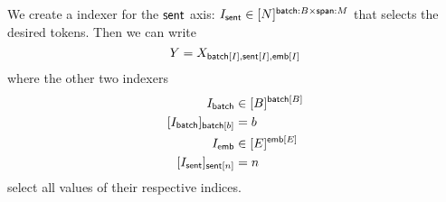 We create a indexer for the $\mathsf{sent}$ axis: $I_{\mathsf{sent}} \in [N]^{\mathsf{batch}:B \times \mathsf{span}: M}$ that selects the desired tokens. Then we can write
\begin{equation*}
  Y = X_{\mathsf{batch}[I], \mathsf{sent}[I], \mathsf{emb}[I]}
\end{equation*}
where the other two indexers
\begin{align*}
  I_{\name{batch}} &\in [B]^{\nset{batch}{B}} \\
  [I_{\name{batch}}]_{\nset{batch}{b}} &= b \\
  I_{\name{emb}} &\in [E]^{\nset{emb}{E}} \\
  [I_{\name{sent}}]_{\nset{sent}{n}} &= n
\end{align*}
select all values of their respective indices.

